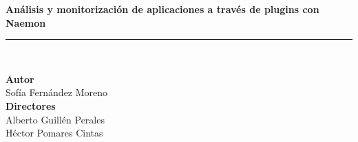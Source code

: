 \begin{titlepage}
 
 
\setlength{\centeroffset}{-0.5\oddsidemargin}
\addtolength{\centeroffset}{0.5\evensidemargin}
\thispagestyle{empty}

\noindent\hspace*{\centeroffset}\begin{minipage}{\textwidth}

\centering

\vspace{3.3cm}

\vspace{0.5cm}


{\Huge\bfseries Análisis y monitorización de aplicaciones a través de plugins con Naemon\\
}
\noindent\rule[-1ex]{\textwidth}{3pt}\\[3.5ex]

\end{minipage}

\vspace{2.5cm}
\noindent\hspace*{\centeroffset}\begin{minipage}{\textwidth}
\centering

\textbf{Autor}\\ {Sofía Fernández Moreno}\\[2.5ex]
\textbf{Directores}\\
{Alberto Guillén Perales\\
Héctor Pomares Cintas}\\[2cm]
\end{minipage}

 
\end{titlepage}


